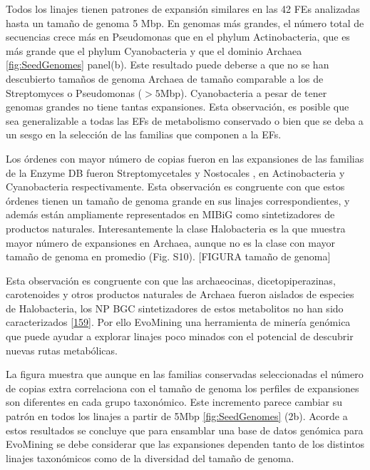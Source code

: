 \documentclass[12pt,twoside]{reedthesis}
\begin{document}
  Todos los linajes tienen patrones de expansión similares en las 42 FEs
  analizadas hasta un tamaño de genoma 5 Mbp. En genomas más grandes, el
  número total de secuencias crece más en Pseudomonas que en el phylum
  Actinobacteria, que es más grande que el phylum Cyanobacteria y que el
  dominio Archaea \autoref{fig:SeedGenomes} panel(b). Este resultado puede
  deberse a que no se han descubierto tamaños de genoma Archaea de tamaño
  comparable a los de Streptomyces o Pseudomonas (\(> 5\)Mbp).
  Cyanobacteria a pesar de tener genomas grandes no tiene tantas
  expansiones. Esta observación, es posible que sea generalizable a todas
  las EFs de metabolismo conservado o bien que se deba a un sesgo en la
  selección de las familias que componen a la EFs.
  
  Los órdenes con mayor número de copias fueron en las expansiones de las
  familias de la Enzyme DB fueron Streptomycetales y Nostocales , en
  Actinobacteria y Cyanobacteria respectivamente. Esta observación es
  congruente con que estos órdenes tienen un tamaño de genoma grande en
  sus linajes correspondientes, y además están ampliamente representados
  en MIBiG como sintetizadores de productos naturales. Interesantemente la
  clase Halobacteria es la que muestra mayor número de expansiones en
  Archaea, aunque no es la clase con mayor tamaño de genoma en promedio
  (Fig. S10). {[}FIGURA tamaño de genoma{]}
  
  Esta observación es congruente con que las archaeocinas,
  dicetopiperazinas, carotenoides y otros productos naturales de Archaea
  fueron aislados de especies de Halobacteria, los NP BGC sintetizadores
  de estos metabolitos no han sido caracterizados
  {[}\protect\hyperlink{ref-charlesworth_untapped_natural_products_Archaea_2015}{159}{]}.
  Por ello EvoMining una herramienta de minería genómica que puede ayudar
  a explorar linajes poco minados con el potencial de descubrir nuevas
  rutas metabólicas.
  
  La figura muestra que aunque en las familias conservadas seleccionadas
  el número de copias extra correlaciona con el tamaño de genoma los
  perfiles de expansiones son diferentes en cada grupo taxonómico. Este
  incremento parece cambiar su patrón en todos los linajes a partir de
  5Mbp \autoref{fig:SeedGenomes} (2b). Acorde a estos resultados se
  concluye que para ensamblar una base de datos genómica para EvoMining se
  debe considerar que las expansiones dependen tanto de los distintos
  linajes taxonómicos como de la diversidad del tamaño de genoma.
  
\end{document}

